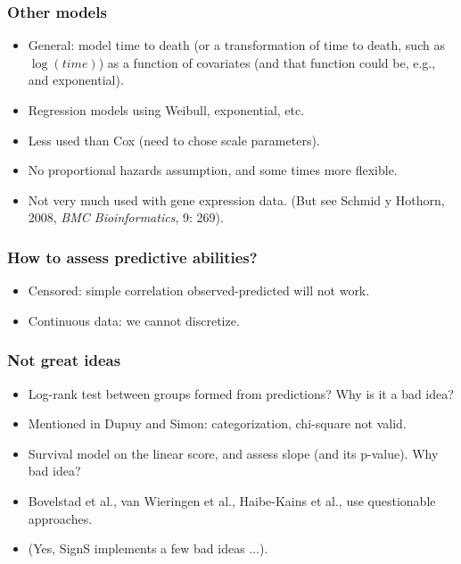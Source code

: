 \begin{frame}
\frametitle{Other models}
\begin{itemize}
\item General: model time to death (or a transformation of time to death, such
  as $\log(time)$) as a function of covariates (and that function could
  be, e.g., and exponential).
\item Regression models using Weibull, exponential, etc.
\item Less used than Cox (need to chose scale parameters).
\item No proportional hazards assumption, and some times more flexible.
\item Not very much used with gene expression data. (But see Schmid y
  Hothorn, 2008, \textit{BMC Bioinformatics}, 9: 269).
\end{itemize}
\end{frame}



\begin{frame}
\frametitle{How to assess predictive abilities?}
\begin{itemize}
\item Censored: simple correlation observed-predicted will not work.
\item Continuous data: we cannot discretize.
\end{itemize}
\end{frame}


\begin{frame}
\frametitle{Not great ideas}

\begin{itemize}
\item Log-rank test between groups formed from predictions? Why is it a
  bad idea?
\pause
\item Mentioned in Dupuy and Simon: categorization, chi-square not valid.
\vspace*{10pt}
\pause
\item Survival model on the linear score, and assess slope (and its
  p-value). Why bad idea?
\vspace*{10pt}
\pause
\item Bovelstad et al., van Wieringen et al., Haibe-Kains et al., use
  questionable approaches.

\item (Yes, SignS implements a few bad ideas  $\ldots$).
\end{itemize}
\end{frame}




